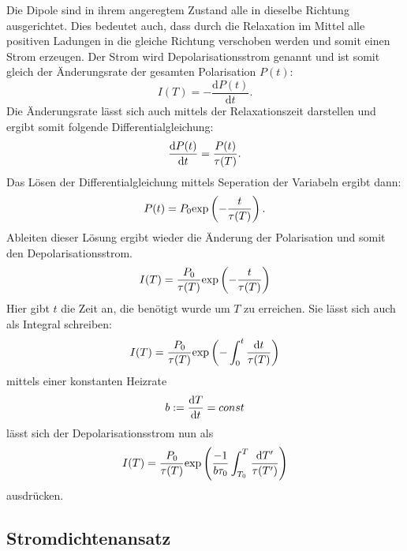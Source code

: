 		Die Dipole sind in ihrem angeregtem Zustand alle in dieselbe Richtung ausgerichtet.
		Dies bedeutet auch, dass durch die Relaxation im Mittel alle positiven Ladungen in 
		die gleiche Richtung verschoben werden und somit einen Strom erzeugen.
		Der Strom wird Depolarisationsstrom genannt und ist somit gleich der Änderungsrate der 
		gesamten Polarisation $P(t)$:
		\begin{equation}
			I(T) = - \frac{\text{d}P(t)}{\text{d}t}.
		\end{equation}
		Die Änderungsrate lässt sich auch mittels der Relaxationszeit darstellen und ergibt somit 
		folgende Differentialgleichung:
		\begin{equation}
			\frac{\text{d} P(t)}{\text{d} t} = \frac{P(t)}{\tau(T)}.
			\label{eqn:diff}
		\end{equation}
		Das Lösen der Differentialgleichung mittels Seperation der Variabeln ergibt dann:
		\begin{equation}
			P(t) = P_0 \text{exp}\left(- \frac{t}{\tau(T)} \right).
		\end{equation}
		Ableiten dieser Lösung ergibt wieder die Änderung der Polarisation und somit den 
		Depolarisationsstrom.
		\begin{equation}
			I(T) = \frac{P_0}{\tau(T)} \text{exp}\left(-\frac{t}{\tau(T)}\right)
		\end{equation}
		Hier gibt $t$ die Zeit an, die benötigt wurde um $T$ zu erreichen.
		Sie lässt sich auch als Integral schreiben:
		\begin{equation}
			I(T) = \frac{P_0}{\tau(T)} \text{exp}\left(-\int_0^t\frac{\text{d}t}{\tau(T)}\right)
			\end{equation}
		mittels einer konstanten Heizrate
		\begin{equation}
			b := \frac{\text{d} T}{\text{d} t} = const
		\end{equation}
		lässt sich der Depolarisationsstrom nun als 
		\begin{equation}
			I(T) = \frac{P_0}{\tau(T)} \text{exp}\left(\frac{-1}{b\tau_0}\int_{T_0}^T\frac{\text{d}T'}{\tau(T')}\right)
		\end{equation}
		ausdrücken.

	\subsection{Stromdichtenansatz}
		
